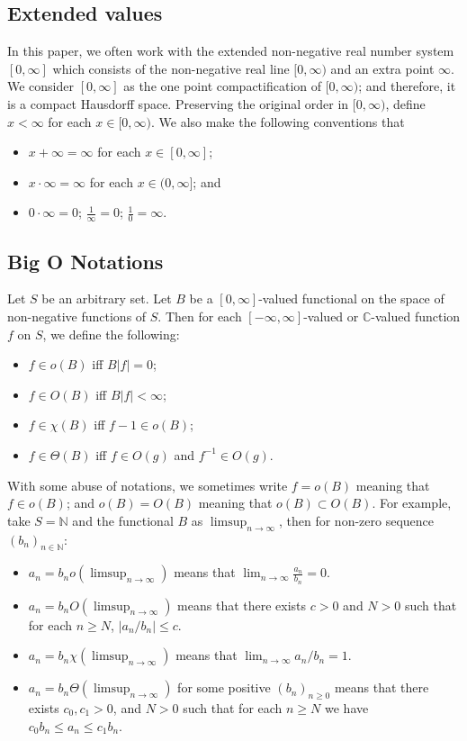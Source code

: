 \documentclass[12pt,a4paper]{amsart}
\numberwithin{equation}{section}
\theoremstyle{plain}
\theoremstyle{definition}
\theoremstyle{remark}
\begin{document}
\subsection{Extended values}
In this paper, we often work with the extended non-negative real number system $[0,\infty]$ which consists of the non-negative real line $[0,\infty)$ and an extra point $\infty$. 
We consider $[0,\infty]$ as the one point compactification of $[0,\infty)$; and therefore, it is a compact Hausdorff space.
Preserving the original order in $[0,\infty)$, define $x < \infty$ for each $x\in [0,\infty)$.
We also make the following conventions that 
\begin{itemize}
\item
$x + \infty = \infty$ for each $x\in [0,\infty]$; 
\item
$x \cdot \infty = \infty$ for each $x\in (0,\infty]$; and
\item
$0 \cdot \infty = 0$; $\frac{1}{\infty} = 0$; $\frac{1}{0} = \infty$.
\end{itemize}
\subsection{Big O Notations}
Let $S$ be an arbitrary set. 
Let $B$ be a $[0,\infty]$-valued functional on the space of non-negative functions of $S$. 
Then for each $[-\infty, \infty]$-valued or $\mathbb C$-valued function $f$ on $S$, we define the following:
\begin{itemize}
\item
$f \in o(B)$ iff $B |f| = 0$; 
\item
$f \in O(B)$ iff $B|f| < \infty$; 
\item
$f \in \chi(B)$ iff $f - 1 \in o(B)$;
\item
$f\in \Theta (B)$ iff $f \in O(g)$ and $f^{-1} \in O(g)$.
\end{itemize}
With some abuse of notations, we sometimes write $f = o(B)$ meaning that $f\in o(B)$; and $o(B) = O(B)$ meaning that $o(B) \subset O(B)$. 
For example, take $S = \mathbb N $ and the functional $B$ as $\limsup_{n\to \infty}$, then for non-zero sequence $(b_n)_{n\in \mathbb N}$:
\begin{itemize}
\item
$a_n = b_n o(\limsup_{n\to \infty})$ means that $\lim_{n\to \infty}\frac{a_n}{b_n} =0$.
\item
$a_n = b_nO(\limsup_{n\to \infty})$ means that there exists $c>0$ and $N > 0$ such that for each $n\geq N$, $|a_n/b_n| \leq c$.
\item
$a_n = b_n \chi(\limsup_{n\to \infty})$ means that $\lim_{n\to \infty} a_n/b_n = 1$.
\item
$a_n = b_n \Theta (\limsup_{n\to \infty})$ for some positive $(b_n)_{n\geq 0}$ means that there exists $c_0,c_1>0$, and $N > 0$ such that for each $n \geq N$ we have $c_0 b_n \leq a_n \leq c_1b_n$.
\end{itemize}
\end{document}
